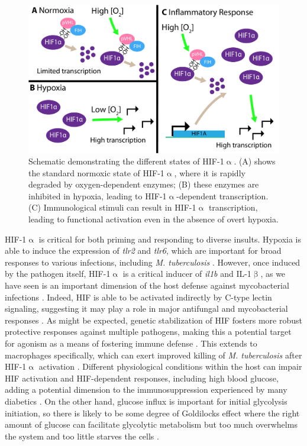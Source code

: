 \begin{figure}
\centering
\includegraphics[width=\textwidth]{images/hifreg.pdf}
\caption{Schematic demonstrating the different states of HIF-1$\upalpha$. (A) shows the standard normoxic state of HIF-1$\upalpha$, where it is rapidly degraded by oxygen-dependent enzymes; (B) these enzymes are inhibited in hypoxia, leading to HIF-1$\upalpha$-dependent transcription. (C) Immunological stimuli can result in HIF-1$\upalpha$ transcription, leading to functional activation even in the absence of overt hypoxia.}
\label{figure:hif}
\end{figure}

HIF-1$\upalpha$ is critical for both priming and responding to diverse insults. Hypoxia is able to induce the expression of \textit{tlr2} and \textit{tlr6}, which are important for broad responses to various infections, including \textit{M. tuberculosis} \citep{Kuhlicke2007}. However, once induced by the pathogen itself, HIF-1$\upalpha$ is a critical inducer of \textit{il1b} and IL-1$\upbeta$, as we have seen is an important dimension of the host defense against mycobacterial infections \citep{Ogryzko2019}. Indeed, HIF is able to be activated indirectly by C-type lectin signaling, suggesting it may play a role in major antifungal and mycobacterial responses \citep{Elder2019, Friedrich2017}. As might be expected, genetic stabilization of HIF fosters more robust protective responses against multiple pathogens, making this a potential target for agonism as a means of fostering immune defense \citep{Schild2020}. This extends to macrophages specifically, which can exert improved killing of \textit{M. tuberculosis} after HIF-1$\upalpha$ activation \citep{Li2021}. Different physiological conditions within the host can impair HIF activation and HIF-dependent responses, including high blood glucose, adding a potential dimension to the immunosuppression experienced by many diabetics \citep{Teran2022}. On the other hand, glucose influx is important for initial glycolysis initiation, so there is likely to be some degree of Goldilocks effect where the right amount of glucose can facilitate glycolytic metabolism but too much overwhelms the system and too little starves the cells \citep{Stunault2018}.

